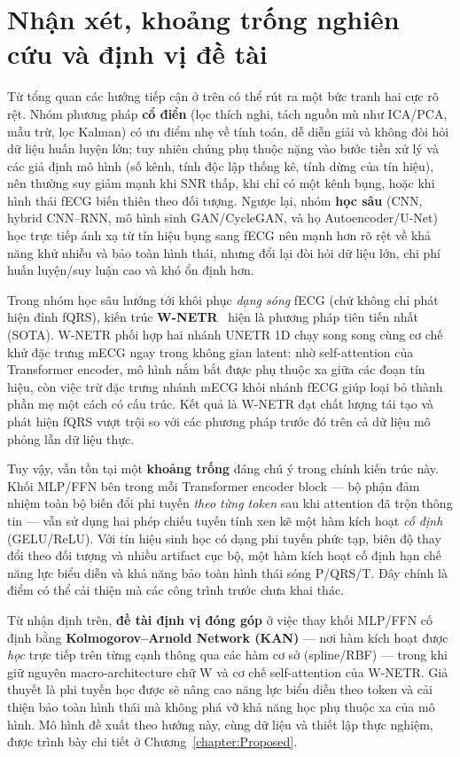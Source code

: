 \documentclass[../DoAn.tex]{subfiles}
\begin{document}
\section{Nhận xét, khoảng trống nghiên cứu và định vị đề tài}
\label{sec:gap_positioning}
Từ tổng quan các hướng tiếp cận ở trên có thể rút ra một bức tranh hai cực rõ rệt. Nhóm phương pháp \textbf{cổ điển} (lọc thích nghi, tách nguồn mù như ICA/PCA, mẫu trừ, lọc Kalman) có ưu điểm nhẹ về tính toán, dễ diễn giải và không đòi hỏi dữ liệu huấn luyện lớn; tuy nhiên chúng phụ thuộc nặng vào bước tiền xử lý và các giả định mô hình (số kênh, tính độc lập thống kê, tính dừng của tín hiệu), nên thường suy giảm mạnh khi SNR thấp, khi chỉ có một kênh bụng, hoặc khi hình thái fECG biến thiên theo đối tượng. Ngược lại, nhóm \textbf{học sâu} (CNN, hybrid CNN--RNN, mô hình sinh GAN/CycleGAN, và họ Autoencoder/U-Net) học trực tiếp ánh xạ từ tín hiệu bụng sang fECG nên mạnh hơn rõ rệt về khả năng khử nhiễu và bảo toàn hình thái, nhưng đổi lại đòi hỏi dữ liệu lớn, chi phí huấn luyện/suy luận cao và khó ổn định hơn.

Trong nhóm học sâu hướng tới khôi phục \emph{dạng sóng} fECG (chứ không chỉ phát hiện đỉnh fQRS), kiến trúc \textbf{W-NETR}~\cite{almadaniOneDimensionalWNETRNonInvasive2023} hiện là phương pháp tiên tiến nhất (SOTA). W-NETR phối hợp hai nhánh UNETR 1D chạy song song cùng cơ chế khử đặc trưng mECG ngay trong không gian latent: nhờ self-attention của Transformer encoder, mô hình nắm bắt được phụ thuộc xa giữa các đoạn tín hiệu, còn việc trừ đặc trưng nhánh mECG khỏi nhánh fECG giúp loại bỏ thành phần mẹ một cách có cấu trúc. Kết quả là W-NETR đạt chất lượng tái tạo và phát hiện fQRS vượt trội so với các phương pháp trước đó trên cả dữ liệu mô phỏng lẫn dữ liệu thực.

Tuy vậy, vẫn tồn tại một \textbf{khoảng trống} đáng chú ý trong chính kiến trúc này. Khối MLP/FFN bên trong mỗi Transformer encoder block --- bộ phận đảm nhiệm toàn bộ biến đổi phi tuyến \emph{theo từng token} sau khi attention đã trộn thông tin --- vẫn sử dụng hai phép chiếu tuyến tính xen kẽ một hàm kích hoạt \emph{cố định} (GELU/ReLU). Với tín hiệu sinh học có dạng phi tuyến phức tạp, biên độ thay đổi theo đối tượng và nhiều artifact cục bộ, một hàm kích hoạt cố định hạn chế năng lực biểu diễn và khả năng bảo toàn hình thái sóng P/QRS/T. Đây chính là điểm có thể cải thiện mà các công trình trước chưa khai thác.

Từ nhận định trên, \textbf{đề tài định vị đóng góp} ở việc thay khối MLP/FFN cố định bằng \textbf{Kolmogorov--Arnold Network (KAN)} --- nơi hàm kích hoạt được \emph{học} trực tiếp trên từng cạnh thông qua các hàm cơ sở (spline/RBF) --- trong khi giữ nguyên macro-architecture chữ W và cơ chế self-attention của W-NETR. Giả thuyết là phi tuyến học được sẽ nâng cao năng lực biểu diễn theo token và cải thiện bảo toàn hình thái mà không phá vỡ khả năng học phụ thuộc xa của mô hình. Mô hình đề xuất theo hướng này, cùng dữ liệu và thiết lập thực nghiệm, được trình bày chi tiết ở Chương~\ref{chapter:Proposed}.
\end{document}
